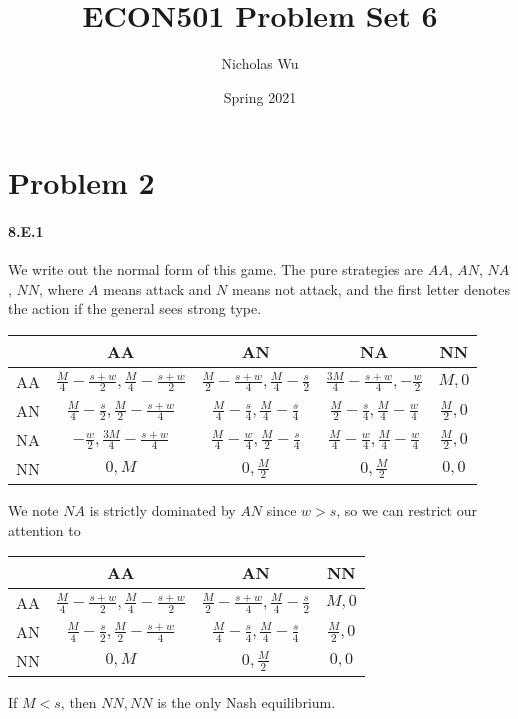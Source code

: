 \documentclass[10pt,letter]{article}
\begin{document}


\title{ECON501 Problem Set 6}

\author{Nicholas Wu}

\date{Spring 2021}

\maketitle

\section*{Problem 2}
\paragraph*{8.E.1} We write out the normal form of this game. The pure strategies are $AA$, $AN$, $NA$, $NN$, where $A$ means attack and $N$ means not attack, and the first letter denotes the action if the general sees strong type.
\begin{center}
\begin{tabular}{|c|c|c|c|c|}
\hline
& AA & AN & NA & NN \\ \hline
AA & $\frac{M}{4} - \frac{s+w}{2}, \frac{M}{4} - \frac{s+w}{2}$ & $\frac{M}{2} - \frac{s+w}{4}, \frac{M}{4} - \frac{s}{2} $ & $ \frac{3M}{4} - \frac{s+w}{4}, -\frac{w}{2}$ & $M, 0$ \\ \hline
AN & $ \frac{M}{4} - \frac{s}{2} , \frac{M}{2} - \frac{s+w}{4}$ & $\frac{M}{4} - \frac{s}{4}, \frac{M}{4} - \frac{s}{4}$ & $ \frac{M}{2} - \frac{s}{4}, \frac{M}{4} - \frac{w}{4}$ & $\frac{M}{2}, 0$ \\ \hline
NA & $ -\frac{w}{2}, \frac{3M}{4} - \frac{s+w}{4}$ & $\frac{M}{4} - \frac{w}{4}, \frac{M}{2} - \frac{s}{4}$ & $ \frac{M}{4} - \frac{w}{4},\frac{M}{4} - \frac{w}{4} $ & $\frac{M}{2}, 0$ \\ \hline
NN & $0, M$ & $0, \frac{M}{2}$ & $0, \frac{M}{2}$ & $0,0$ \\ \hline
\end{tabular}
\end{center}
We note $NA$ is strictly dominated by $AN$ since $w > s$, so we can restrict our attention to
\begin{center}
\begin{tabular}{|c|c|c|c|}
\hline
& AA & AN & NN \\ \hline
AA & $\frac{M}{4} - \frac{s+w}{2}, \frac{M}{4} - \frac{s+w}{2}$ & $\frac{M}{2} - \frac{s+w}{4}, \frac{M}{4} - \frac{s}{2} $ & $M, 0$ \\ \hline
AN & $ \frac{M}{4} - \frac{s}{2} , \frac{M}{2} - \frac{s+w}{4}$ & $\frac{M}{4} - \frac{s}{4}, \frac{M}{4} - \frac{s}{4}$ & $\frac{M}{2}, 0$ \\ \hline
NN & $0, M$ & $0, \frac{M}{2}$ & $0,0$ \\ \hline
\end{tabular}
\end{center}
If $M < s$, then $NN, NN$ is the only Nash equilibrium.
\end{document}
